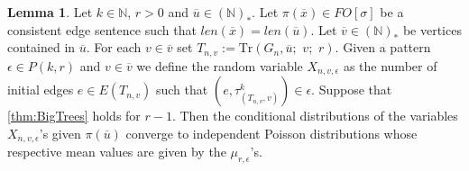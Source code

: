 \documentclass[12pt,notitlepage,a4paper]{article}
\theoremstyle{definition}
\newtheorem{lemma}{Lemma}[section]
\newcommand{\N}{\mathbb{N}}
\newcommand{\Tr}{\mathrm{Tr}}
\begin{document}
\begin{lemma}\label{lem:poisedges}
	Let $k\in \N$, $r>0$ and $\overline{u}\in (\N)_*$.
	Let $\pi(\overline{x})\in FO[\sigma]$ be a consistent
	edge sentence such that 
	$len(\overline{x})=len(\overline{u})$.
	Let $\overline{v}\in (\N)_*$ be vertices contained
	in $\overline{u}$. For each $v\in \overline{v}$
	set $T_{n,v}:= \Tr\left(G_n, \overline{u};\,\,v;\,\,r\right)$.
	Given a pattern $\epsilon\in P(k,r)$ and $v\in \overline{v}$
	we define the random variable $X_{n,v,\epsilon}$ as
	the number of initial edges $e\in E(T_{n,v})$ such 
	that $(e,\tau^k_{(T_{n,v},v)})\in \epsilon$. Suppose that
	\cref{thm:BigTrees} holds for $r-1$. Then the conditional 
	distributions of the variables $X_{n,v,\epsilon}$'s given
	$\pi(\overline{u})$ converge to independent Poisson distributions
	whose respective mean values are given by the $\mu_{r,\epsilon}$'s. 
\end{lemma}
\end{document}
